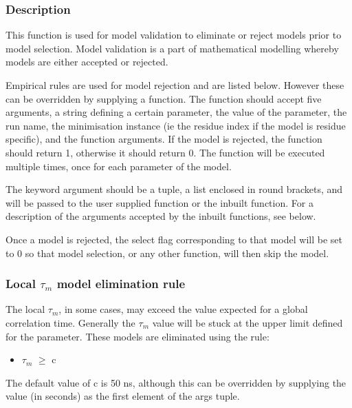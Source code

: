 \subsubsection{Description}

This function is used for model validation to eliminate or reject models prior to model selection.  Model validation is a part of mathematical modelling whereby models are either accepted or rejected.


Empirical rules are used for model rejection and are listed below.  However these can be overridden by supplying a function.  The function should accept five arguments, a string defining a certain parameter, the value of the parameter, the run name, the minimisation instance (ie the residue index if the model is residue specific), and the function arguments.  If the model is rejected, the function should return 1, otherwise it should return 0.  The function will be executed multiple times, once for each parameter of the model.


The  keyword argument should be a tuple, a list enclosed in round brackets, and will be passed to the user supplied function or the inbuilt function.  For a description of the arguments accepted by the inbuilt functions, see below.


Once a model is rejected, the select flag corresponding to that model will be set to 0 so that model selection, or any other function, will then skip the model.



\subsubsection{Local $\tau_m$ model elimination rule}

The local $\tau_m$, in some cases, may exceed the value expected for a global correlation time. Generally the $\tau_m$ value will be stuck at the upper limit defined for the parameter.  These models are eliminated using the rule:


\begin{itemize}
\item[] $\tau_m$ $\ge$ c 
\end{itemize}


The default value of c is 50 ns, although this can be overridden by supplying the value (in seconds) as the first element of the args tuple.




